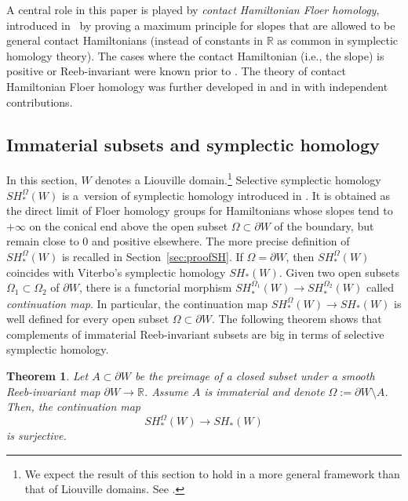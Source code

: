 \documentclass[pdftex]{sigma}
\numberwithin{equation}{section}
\newtheorem{Theorem}{Theorem}
\theoremstyle{definition}
\begin{document}
{A central role in this paper is played by \emph{contact Hamiltonian Floer homology}, introduced in~\cite{merry2019maximum} by proving a maximum principle for slopes that are allowed to be general contact Hamiltonians (instead of constants in $\mathbb{R}$ as common in symplectic homology theory). The cases where the contact Hamiltonian (i.e., the slope) is positive \cite{seidel2008biased} or Reeb-invariant \cite{ritter2016circle} were known prior to \cite{merry2019maximum}. The theory of contact Hamiltonian Floer homology was further developed in \cite{djordjevic2023quantitative, uljarevic2022hamiltonian} and in \cite{cant2023shelukhin, cant2024remarks} with independent contributions.}

\subsection{Immaterial subsets and symplectic homology}

In this section, $W$ denotes a Liouville domain.\footnote{We expect the result of this section to hold in a more general framework than that of Liouville domains. See \cite[Remark~1.5]{uljarevic2023selective}.} Selective symplectic homology $SH_\ast^\Omega(W)$ is a~version of symplectic homology introduced in \cite{uljarevic2023selective}. It is obtained as the direct limit of Floer homology groups for Hamiltonians whose slopes tend to $+\infty$ on the conical end above the open subset $\Omega\subset \partial W $ of the boundary, but remain close to 0 and positive elsewhere. The more precise definition of $SH_\ast^\Omega(W)$ is recalled in Section~\ref{sec:proofSH}.
If $\Omega=\partial W$, then $SH^\Omega_\ast(W)$ coincides with Viterbo's {\cite{viterbo1999functors}} symplectic homology $SH_\ast(W)$. Given two open subsets $\Omega_1\subset \Omega_2$ of $\partial W$, there is a functorial morphism $SH^{\Omega_1}_\ast(W)\to SH^{\Omega_2}_\ast(W)$ called \emph{continuation map}. In particular, the continuation map $SH_\ast^\Omega(W)\to SH_\ast(W)$ is well defined for every open subset $\Omega\subset\partial W$.
The following theorem shows that complements of immaterial Reeb-invariant subsets are big in terms of selective symplectic homology.

\begin{Theorem}\label{thm:complement-big}
Let $A\subset \partial W$ be the preimage of a closed subset under a smooth Reeb-invariant map {$\partial W\to\mathbb{R}$}. Assume $A$ is immaterial and denote $\Omega:=\partial W\setminus A$. Then, the continuation map
\begin{equation*}SH^{\Omega}_\ast(W)\to SH_\ast(W)\end{equation*}
is surjective.
\end{Theorem}
\end{document}
